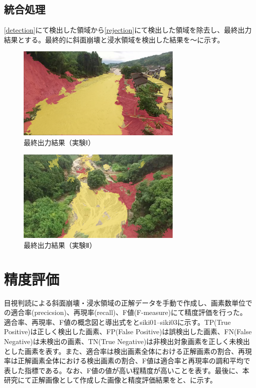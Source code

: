 \documentclass[../Thesis]{subfiles}
\begin{document}
\subsection{統合処理}
	\ref{detection}にて検出した領域から\ref{rejection}にて検出した領域を除去し、最終出力結果とする。最終的に斜面崩壊と浸水領域を検出した結果を～に示す。


\begin{figure}[h]
	\centering
	\includegraphics[width=8cm]{img/result1.png}
	\caption{最終出力結果（実験Ⅰ）}
	\label{img19}
\end{figure}
\begin{figure}[h]
	\centering
	\includegraphics[width=8cm]{img/result2.png}
	\caption{最終出力結果（実験Ⅱ）}
	\label{img20}
\end{figure}


\section{精度評価}
目視判読による斜面崩壊・浸水領域の正解データを手動で作成し、画素数単位での適合率(precicsion)、再現率(recall)、F値(F-measure)にて精度評価を行った。適合率、再現率、F値の概念図と導出式をとsiki{01}--siki{03}に示す。TP(True Positive)は正しく検出した画素、FP(False Positive)は誤検出した画素、FN(False Negative)は未検出の画素、TN(True Negative)は非検出対象画素を正しく未検出とした画素を表す。また、適合率は検出画素全体における正解画素の割合、再現率は正解画素全体における検出画素の割合、F値は適合率と再現率の調和平均で表した指標である。なお、F値の値が高い程精度が高いことを表す。最後に、本研究にて正解画像として作成した画像と精度評価結果をと、に示す。
\end{document}
